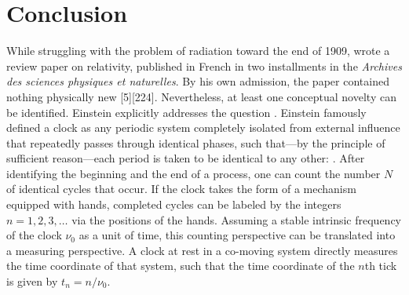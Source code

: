 \documentclass[pdflatex,sn-basic]{sn-jnl}
\begin{document}
\section{Conclusion}
%
While struggling with the problem of radiation toward the end of 1909, \citet{Einstein1910} wrote a review paper on relativity, published in French in two installments in the \textit{Archives des sciences physiques et naturelles}. By his own admission, the paper contained nothing physically new [5][224]. Nevertheless, at least one conceptual novelty can be identified. Einstein explicitly addresses the question  \citep[21]{Einstein1910}. Einstein famously defined a clock as any periodic system completely isolated from external influence that repeatedly passes through identical phases, such that—by the principle of sufficient reason—each period is taken to be identical to any other:  \citep[21]{Einstein1910}. After identifying the beginning and the end of a process, one can count the number $N$ of identical cycles that occur. If the clock takes the form of a mechanism equipped with hands, completed cycles can be labeled by the integers $n=1,2,3,\ldots$ via the positions of the hands. Assuming a stable intrinsic frequency of the clock $\nu_0$ as a unit of time, this counting perspective can be translated into a measuring perspective. A clock at rest in a co-moving system directly measures the time coordinate of that system, such that the time coordinate of the $n$th tick is given by $t_n = n/\nu_0$.
\end{document}
